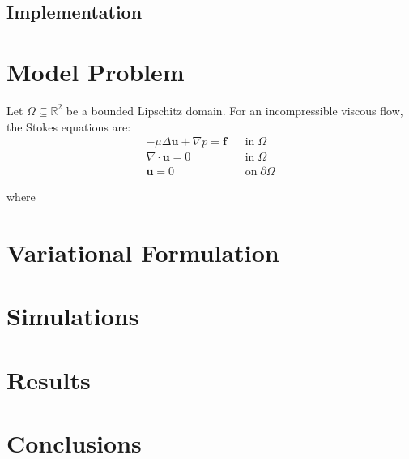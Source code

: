 \documentclass[10pt]{article}
\numberwithin{equation}{section}
\begin{document}
	\subsection{Implementation}
	
	\section{Model Problem}
	
	Let $\Omega \subseteq \mathbb{R}^{2}$ be a bounded Lipschitz domain. For an incompressible viscous flow, the Stokes equations are:
	\begin{align}
		-\mu\Delta \mathbf{u} + \nabla p = \mathbf{f} \;\;\;&\text{in}\;\Omega\\
		\nabla\cdot\mathbf{u} = 0 \;\;\;&\text{in}\;\Omega\\
		\mathbf{u} = 0 \;\;\;&\text{on}\;\partial\Omega
	\end{align}
	
	\noindent where
	
	\section{Variational Formulation}
	
	\section{Simulations}
	
	\section{Results}
	
	\section{Conclusions}
	
\end{document}
